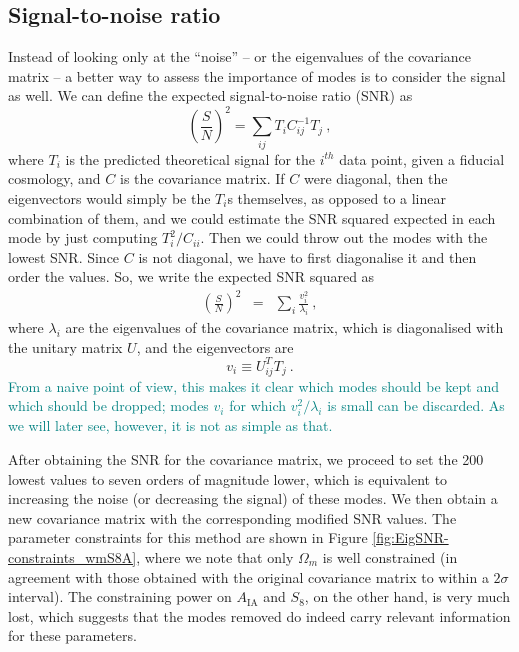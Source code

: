 \documentclass[twocolumn]{\docclass}
\newcommand{\rf}[1]{Figure \ref{fig:#1}}
\newcommand\be{\begin{equation}}
\newcommand\ee{\end{equation}}
\def\bea{\begin{eqnarray}}
\def\eea{\end{eqnarray}}
\begin{document}
	\subsection{Signal-to-noise ratio}
	\label{subsec:snr}
	
	Instead of looking only at the ``noise'' -- or the eigenvalues of the covariance matrix -- a better way to assess the importance of modes is to consider the signal as well. We can define the expected signal-to-noise ratio (SNR) as
	\be
	\left(\frac{S}{N}\right)^2 = \sum_{ij} T_i C^{-1}_{ij} T_j\
	,\ee
	where $T_i$ is the predicted theoretical signal for the $i^{th}$ data point, given a fiducial cosmology, and $C$ is the covariance matrix. If $C$ were diagonal, then the eigenvectors would simply be the $T_i$s themselves, as opposed to a linear combination of them, and we could estimate the SNR squared expected in each mode by just computing $T_i^2/C_{ii}$. Then we could throw out the modes with the lowest SNR. Since $C$ is not diagonal, we have to first diagonalise it and then order the values. So, we write the expected SNR squared as
	\bea
	\left(\frac{S}{N}\right)^2
	&=& \sum_{i} \frac{v_i^2}{\lambda_i}\
	,\eea
	where $\lambda_i$ are the eigenvalues of the covariance matrix, which is diagonalised with the unitary matrix $U$, and the eigenvectors are 
	\be
	v_i\equiv U_{ij}^T T_j\
	.\ee
	\textcolor{teal}{From a naive point of view, this makes it clear which modes should be kept and which should be dropped; modes $v_i$ for which $v_i^2/\lambda_i$ is small can be discarded. As we will later see, however, it is not as simple as that.}
	
	After obtaining the SNR for the covariance matrix, we proceed to set the 200 lowest values to seven orders of magnitude lower, which is equivalent to increasing the noise (or decreasing the signal) of these modes. We then obtain a new covariance matrix with the corresponding modified SNR values. 
	The parameter constraints for this method are shown in \rf{EigSNR-constraints_wmS8A}, where we note that only $\Omega_m$ is well constrained (in agreement with those obtained with the original covariance matrix to within a $2\sigma$ interval). The constraining power on $A_{\mathrm{IA}}$ and $S_8$, on the other hand, is very much lost, which suggests that the modes removed do indeed carry relevant information for these parameters.
	
\end{document}
